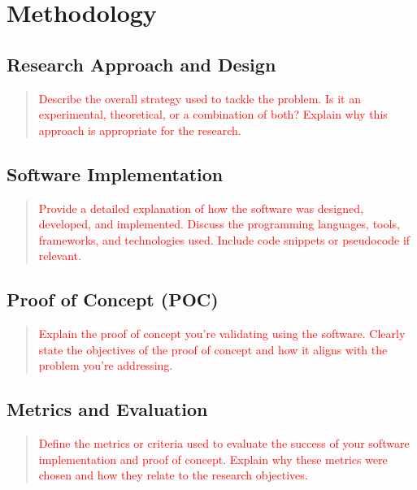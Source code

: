 \section{Methodology}
\label{sec:methodology}


\subsection{Research Approach and Design}
\label{ssec:research-approach}
\begin{quote}\textcolor{red}{
    Describe the overall strategy used to tackle the problem. Is it an experimental, theoretical, or a combination of both? Explain why this approach is appropriate for the research.
}\end{quote}

\subsection{Software Implementation}
\label{ssec:software-implementation}
\begin{quote}\textcolor{red}{
    Provide a detailed explanation of how the software was designed, developed, and implemented. Discuss the programming languages, tools, frameworks, and technologies used. Include code snippets or pseudocode if relevant.
}\end{quote}

\subsection{Proof of Concept (POC)}
\label{ssec:proof-of-concept}
\begin{quote}\textcolor{red}{
    Explain the proof of concept you're validating using the software. Clearly state the objectives of the proof of concept and how it aligns with the problem you're addressing.
}\end{quote}

\subsection{Metrics and Evaluation}
\label{ssec:metrics}
\begin{quote}\textcolor{red}{
    Define the metrics or criteria used to evaluate the success of your software implementation and proof of concept. Explain why these metrics were chosen and how they relate to the research objectives.
}\end{quote}

